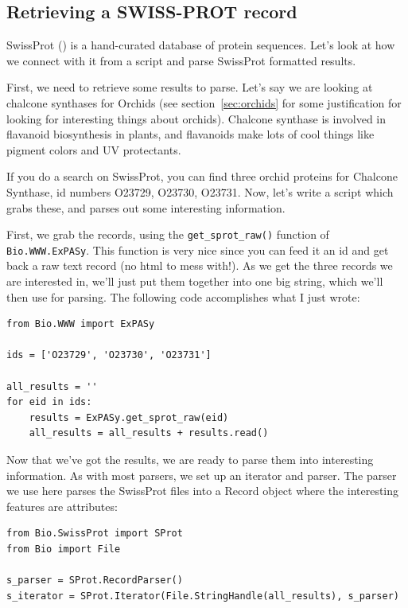 \documentclass{report}
\begin{document}
\subsection{Retrieving a SWISS-PROT record}

SwissProt () is a hand-curated database of protein sequences. Let's look at how we connect with it from a script and parse SwissProt formatted results. 


First, we need to retrieve some results to parse. Let's say we are looking at chalcone synthases for Orchids (see section~\ref{sec:orchids} for some justification for looking for interesting things about orchids). Chalcone synthase is involved in flavanoid biosynthesis in plants, and flavanoids make lots of cool things like pigment colors and UV protectants. 


If you do a search on SwissProt, you can find three orchid proteins for Chalcone Synthase, id numbers O23729, O23730, O23731. Now, let's write a script which grabs these, and parses out some interesting information.


First, we grab the records, using the \verb|get_sprot_raw()| function of \verb|Bio.WWW.ExPASy|. This function is very nice since you can feed it an id and get back a raw text record (no html to mess with!). As we get the three records we are interested in, we'll just put them together into one big string, which we'll then use for parsing. The following code accomplishes what I just wrote:

\begin{verbatim}
from Bio.WWW import ExPASy

ids = ['O23729', 'O23730', 'O23731']

all_results = ''
for eid in ids:
    results = ExPASy.get_sprot_raw(eid)
    all_results = all_results + results.read()
\end{verbatim}

Now that we've got the results, we are ready to parse them into interesting information. As with most parsers, we set up an iterator and parser. The parser we use here parses the SwissProt files into a Record object where the interesting features are attributes:

\begin{verbatim}
from Bio.SwissProt import SProt
from Bio import File

s_parser = SProt.RecordParser()
s_iterator = SProt.Iterator(File.StringHandle(all_results), s_parser)
\end{verbatim}
\end{document}
